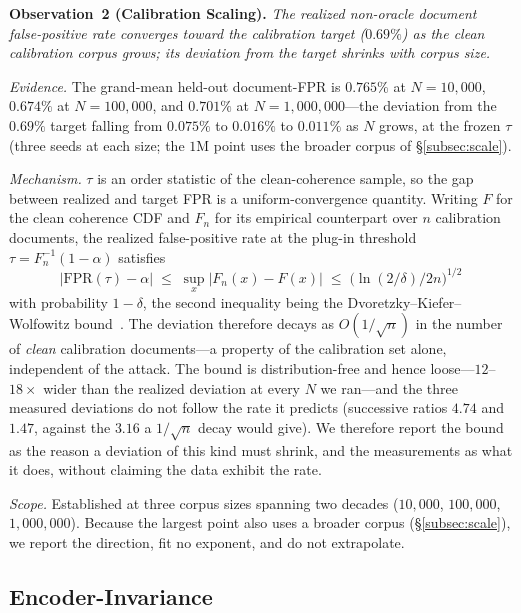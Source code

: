 \documentclass[10pt,journal,compsoc]{IEEEtran}
\begin{document}
\smallskip
\noindent\textbf{Observation~2 (Calibration Scaling).}
\emph{The realized non-oracle document false-positive rate converges toward the
calibration target ($0.69\%$) as the clean calibration corpus grows; its deviation
from the target shrinks with corpus size.}

\emph{Evidence.} The grand-mean held-out document-FPR is $0.765\%$ at $N=10{,}000$,
$0.674\%$ at $N=100{,}000$, and $0.701\%$ at $N=1{,}000{,}000$---the deviation from the
$0.69\%$ target falling from $0.075\%$ to $0.016\%$ to $0.011\%$ as $N$ grows, at the
frozen $\tau$ (three seeds at each size; the $1$M point uses the broader corpus of
\S\ref{subsec:scale}).

\emph{Mechanism.} $\tau$ is an order statistic of the clean-coherence sample, so the gap
between realized and target FPR is a uniform-convergence quantity. Writing $F$ for the clean
coherence CDF and $F_n$ for its empirical counterpart over $n$ calibration documents, the
realized false-positive rate at the plug-in threshold $\tau=F_n^{-1}(1-\alpha)$ satisfies
\[
  \bigl|\mathrm{FPR}(\tau)-\alpha\bigr| \;\le\; \sup_x \bigl|F_n(x)-F(x)\bigr|
  \;\le\; \bigl(\ln(2/\delta)/2n\bigr)^{1/2}
\]
with probability $1-\delta$, the second inequality being the
Dvoretzky--Kiefer--Wolfowitz bound~\cite{dkw}. The deviation therefore decays as
$O(1/\sqrt{n})$ in the number of \emph{clean} calibration documents---a property of the
calibration set alone, independent of the attack. The bound is distribution-free and hence
loose---$12$--$18\times$ wider than the realized deviation at every $N$ we ran---and the
three measured deviations do not follow the rate it predicts (successive ratios $4.74$ and
$1.47$, against the $3.16$ a $1/\sqrt{n}$ decay would give). We therefore report the bound as
the reason a deviation of this kind must shrink, and the measurements as what it does, without
claiming the data exhibit the rate.

\emph{Scope.} Established at three corpus sizes spanning two decades ($10{,}000$,
$100{,}000$, $1{,}000{,}000$). Because the largest point also uses a broader corpus
(\S\ref{subsec:scale}), we report the direction, fit no exponent, and do not extrapolate.

\subsection{Encoder-Invariance}
\label{subsec:encoder}
\end{document}
